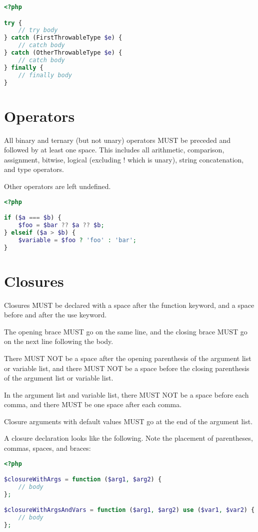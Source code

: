 \begin{lstlisting}[language=PHP]
<?php

try {
    // try body
} catch (FirstThrowableType $e) {
    // catch body
} catch (OtherThrowableType $e) {
    // catch body
} finally {
    // finally body
}
\end{lstlisting}

\section{Operators}

All binary and ternary (but not unary) operators MUST be preceded and followed by at least one space. This includes all arithmetic, comparison, assignment, bitwise, logical (excluding ! which is unary), string concatenation, and type operators.

Other operators are left undefined.




\begin{lstlisting}[language=PHP]
<?php

if ($a === $b) {
    $foo = $bar ?? $a ?? $b;
} elseif ($a > $b) {
    $variable = $foo ? 'foo' : 'bar';
}
\end{lstlisting}

\section{Closures}

Closures MUST be declared with a space after the function keyword, and a space before and after the use keyword.

The opening brace MUST go on the same line, and the closing brace MUST go on the next line following the body.

There MUST NOT be a space after the opening parenthesis of the argument list or variable list, and there MUST NOT be a space before the closing parenthesis of the argument list or variable list.

In the argument list and variable list, there MUST NOT be a space before each comma, and there MUST be one space after each comma.

Closure arguments with default values MUST go at the end of the argument list.

A closure declaration looks like the following. Note the placement of parentheses, commas, spaces, and braces:



\begin{lstlisting}[language=PHP]
<?php

$closureWithArgs = function ($arg1, $arg2) {
    // body
};

$closureWithArgsAndVars = function ($arg1, $arg2) use ($var1, $var2) {
    // body
};
\end{lstlisting}



